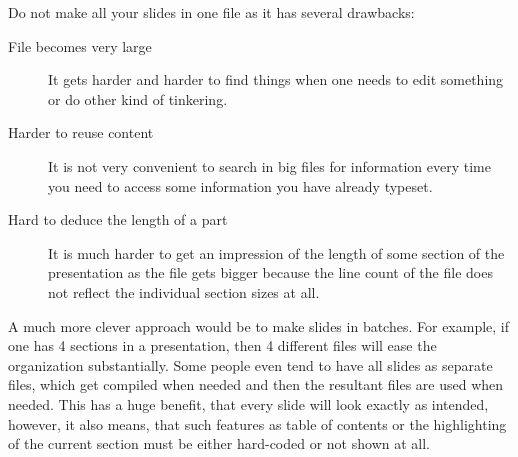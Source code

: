 \documentclass[
]{scrartcl}
\begin{document}
%
Do not make all your slides in one file as it has several drawbacks:
\begin{description}
    \item[File becomes very large]
        It gets harder and harder to find things when one needs to edit
            something or do other kind of tinkering.
    \item[Harder to reuse content]
        It is not very convenient to search in big files for information
            every time you need to access some information you have already
            typeset.
    \item[Hard to deduce the length of a part]
        It is much harder to get an impression of the length of some section of
            the presentation as the file gets bigger because the line count of
            the file does not reflect the individual section sizes at all.
\end{description}

%
A much more clever approach would be to make slides in batches.
%
For example, if one has 4 sections in a presentation, then 4 different files
    will ease the organization substantially.
%
Some people even tend to have all slides as separate  files, which
    get compiled when needed and then the resultant  files are used
    when needed.
%
This has a huge benefit, that every slide will look exactly as intended,
    however, it also means, that such features as table of contents or the
    highlighting of the current section must be either hard-coded or not shown
    at all.
\end{document}
